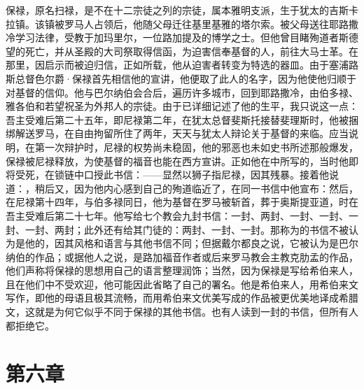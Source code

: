 保禄，原名扫禄，是不在十二宗徒之列的宗徒，属本雅明支派，生于犹太的吉斯卡拉镇。该镇被罗马人占领后，他随父母迁往基里基雅的塔尔索。被父母送往耶路撒冷学习法律，受教于加玛里尔，一位路加提及的博学之士。但他曾目睹殉道者斯德望的死亡，并从圣殿的大司祭取得信函，为迫害信奉基督的人，前往大马士革。在那里，因启示而被迫归信，正如所载，他从迫害者转变为特选的器皿。由于塞浦路斯总督色尔爵·保禄首先相信他的宣讲，他便取了此人的名字，因为他使他归顺于对基督的信仰。他与巴尔纳伯会合后，遍历许多城市，回到耶路撒冷，由伯多禄、雅各伯和若望祝圣为外邦人的宗徒。由于已详细记述了他的生平，我只说这一点：吾主受难后第二十五年，即尼禄第二年，在犹太总督斐斯托接替斐理斯时，他被捆绑解送罗马，在自由拘留所住了两年，天天与犹太人辩论关于基督的来临。应当说明，在第一次辩护时，尼禄的权势尚未稳固，他的邪恶也未如史书所述那般爆发，保禄被尼禄释放，为使基督的福音也能在西方宣讲。正如他在中所写的，当时他即将受死，在锁链中口授此书信：——显然以狮子指尼禄，因其残暴。接着他说道：，稍后又，因为他内心感到自己的殉道临近了，在同一书信中他宣布：然后，在尼禄第十四年，与伯多禄同日，他为基督在罗马被斩首，葬于奥斯提亚道，时在吾主受难后第二十七年。他写给七个教会九封书信：一封、两封、一封、一封、一封、一封、两封；此外还有给其门徒的：两封、一封、一封。那称为的书信不被认为是他的，因其风格和语言与其他书信不同；但据戴尔都良之说，它被认为是巴尔纳伯的作品；或据他人之说，是路加福音作者或后来罗马教会主教克肋孟的作品，他们声称将保禄的思想用自己的语言整理润饰；当然，因为保禄是写给希伯来人，且在他们中不受欢迎，他可能因此省略了自己的署名。他是希伯来人，用希伯来文写作，即他的母语且极其流畅，而用希伯来文优美写成的作品被更优美地译成希腊文，这就是为何它似乎不同于保禄的其他书信。也有人读到一封的书信，但所有人都拒绝它。\par


\section{第六章}

